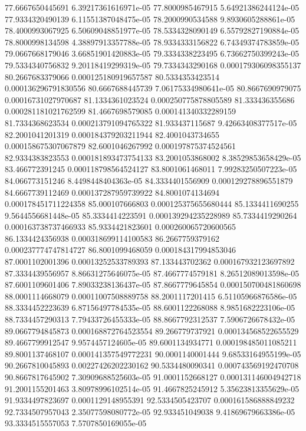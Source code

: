 {77.6667650445691 6.39217361616971e-05
77.8000985467915 5.64921386244124e-05
77.9334320490139 6.11551387048475e-05
78.2000990534588 9.8930605288861e-05
78.4000993067925 6.50609048851977e-05
78.5334328090149 6.55792827190884e-05
78.8000998134598 4.38897913357788e-05
78.9334333156822 6.74349374783859e-05
79.0667668179046 3.66851901420883e-05
79.3334338223495 6.73662750399243e-05
79.5334340756832 9.20118419299319e-05
79.7334343290168 0.000179306098355137
80.2667683379066 0.000125180919657587
80.5334353423514 0.000136296791830556
80.6667688445739 7.06175334980641e-05
80.8667690979075 0.00016731027970687
81.1334361023524 0.000250775878805589
81.333436355686 0.000281181021762599
81.4667698579085 0.000141340332289159
81.7334368623534 0.000213791094765322
81.933437115687 9.42663408377517e-05
82.2001041201319 0.000184379203211944
82.4001043734655 0.000158675307067879
82.6001046267992 0.000197875374524561
82.9334383823553 0.000181893473754133
83.2001053868002 8.38529853658429e-05
83.466772391245 0.000118798564524127
83.8001061468011 7.99283250507223e-05
84.066773151246 8.4498448404363e-05
84.3334401556909 0.000129278896551879
84.6667739112469 0.000137287959739922
84.8001074134694 0.000178451711224358
85.000107666803 0.000125375655680444
85.1334411690255 9.5644556681448e-05
85.3334414223591 0.000139294235228989
85.7334419290264 0.000163738737466933
85.9334421823601 0.000260065720600565
86.1334424356938 0.000318699114100583
86.2667759379162 0.000237774747814727
86.8001099468059 0.000184317994853046
87.0001102001396 0.00013252533789393
87.133443702362 0.000167932123697892
87.3334439556957 8.86631275646075e-05
87.4667774579181 8.26512089013598e-05
87.6001109601406 7.89033238136437e-05
87.8667779645854 0.000150700481860698
88.0001114668079 0.00011007508889758
88.2001117201415 6.51105966876586e-05
88.3334452223639 6.87156497784535e-05
88.6001122268088 8.9851682223106e-05
88.7334457290313 7.79433726455333e-05
88.8667792312537 7.5906726678432e-05
89.0667794845873 0.000168872764523554
89.266779737921 0.000134568522655529
89.4667799912547 9.9574457124605e-05
89.6001134934771 0.000198485011085211
89.8001137468107 0.000141357549772231
90.0001140001444 9.68533164955199e-05
90.2667810045893 0.00227426202230162
90.5334480090341 0.000743569192470708
90.8667817645902 7.30909688525603e-05
91.0001152668127 0.000131146004942718
91.2001155201463 3.80978996102514e-05
91.4667825245912 5.35623813355629e-05
91.9334497823697 0.0001129148955391
92.5334505423707 0.000161586888849232
92.7334507957043 2.35077598080772e-05
92.933451049038 9.41869679663386e-05
93.3334515557053 7.5707850169055e-05
}
